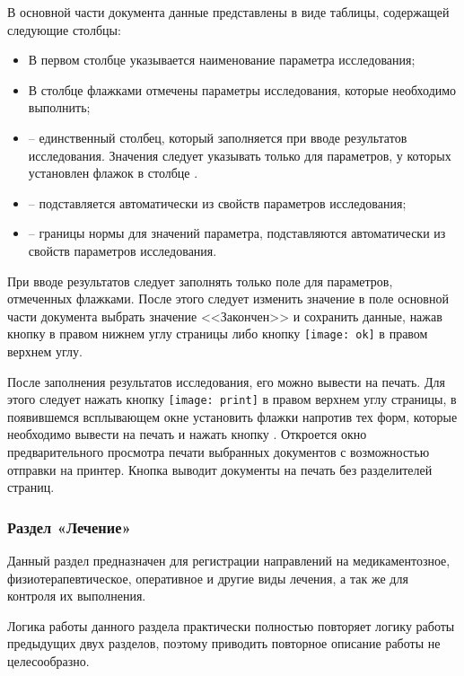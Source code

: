 В основной части документа данные представлены в виде таблицы, содержащей следующие столбцы: 

\begin{itemize}
 \item В первом столбце указывается наименование параметра исследования;
 \item В столбце  флажками отмечены параметры исследования, которые необходимо выполнить;
 \item {} -- единственный столбец, который заполняется при вводе результатов исследования. Значения следует указывать только для параметров, у которых установлен флажок в столбце .
 \item {} -- подставляется автоматически из свойств параметров исследования;
 \item {} -- границы нормы для значений параметра, подставляются автоматически из свойств параметров исследования.
\end{itemize}

При вводе результатов следует заполнять только поле  для параметров, отмеченных флажками. После этого следует изменить значение в поле  основной части документа выбрать значение <<Закончен>> и сохранить данные, нажав кнопку  в правом нижнем углу страницы либо кнопку \texttt{[image: ok]} в правом верхнем углу.    

После заполнения результатов исследования, его можно вывести на печать. Для этого следует нажать кнопку \texttt{[image: print]} в правом верхнем углу страницы, в появившемся всплывающем окне установить флажки напротив тех форм, которые необходимо вывести на печать и нажать кнопку . Откроется окно предварительного просмотра печати выбранных документов с возможностью отправки на принтер. Кнопка  выводит документы на печать без разделителей страниц.

\subsubsection{Раздел «Лечение»} \label{ev_obr_lek}

Данный раздел предназначен для регистрации направлений на медикаментозное, физиотерапевтическое, оперативное и другие виды лечения, а так же для контроля их выполнения.

Логика работы данного раздела практически полностью повторяет логику работы предыдущих двух разделов, поэтому приводить повторное описание работы не целесообразно.


